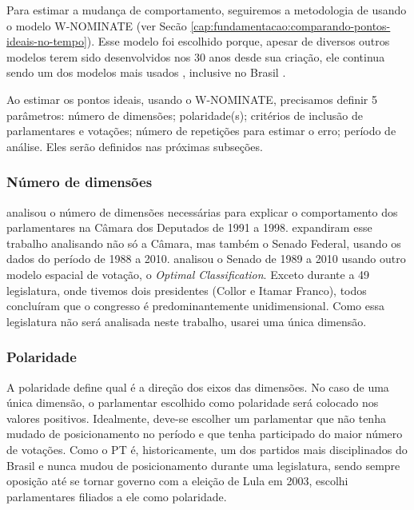 \documentclass[a4paper,titlepage]{ppgi}\usepackage[]{graphicx}\usepackage[]{color}
\begin{document}
Para estimar a mudança de comportamento, seguiremos a metodologia de
 usando o modelo W-NOMINATE \cite{Poole1985} (ver Secão
\ref{cap:fundamentacao:comparando-pontos-ideais-no-tempo}). Esse modelo foi
escolhido porque, apesar de diversos outros modelos terem sido desenvolvidos
nos 30 anos desde sua criação, ele continua sendo um dos modelos mais usados
\cite{Poole2011}, inclusive no Brasil
\cite{Leoni2002,Desposato2005b,Zucco2009,Freitas2012,Bernabel2015}.

Ao estimar os pontos ideais, usando o W-NOMINATE, precisamos definir 5
parâmetros: número de dimensões; polaridade(s); critérios de inclusão de
parlamentares e votações; número de repetições para estimar o erro; período
de análise. Eles serão definidos nas próximas subseções.

\subsubsection{Número de dimensões}

 analisou o número de dimensões necessárias para explicar
o comportamento dos parlamentares na Câmara dos Deputados de 1991 a 1998.
 expandiram esse trabalho analisando não só a Câmara,
mas também o Senado Federal, usando os dados do período de 1988 a 2010.
 analisou o Senado de 1989 a 2010 usando outro modelo
espacial de votação, o \emph{Optimal Classification}. Exceto durante a
49\textordfeminine{} legislatura, onde tivemos dois presidentes (Collor e
Itamar Franco), todos concluíram que o congresso é predominantemente
unidimensional. Como essa legislatura não será analisada neste trabalho, usarei
uma única dimensão.

\subsubsection{Polaridade}

A polaridade define qual é a direção dos eixos das dimensões. No caso de uma
única dimensão, o parlamentar escolhido como polaridade será colocado nos
valores positivos. Idealmente, deve-se escolher um parlamentar que não tenha
mudado de posicionamento no período e que tenha participado do maior número de
votações. Como o PT é, historicamente, um dos partidos mais disciplinados do Brasil e
nunca mudou de posicionamento durante uma legislatura, sendo sempre oposição
até se tornar governo com a eleição de Lula em 2003, escolhi parlamentares
filiados a ele como polaridade.
\end{document}
